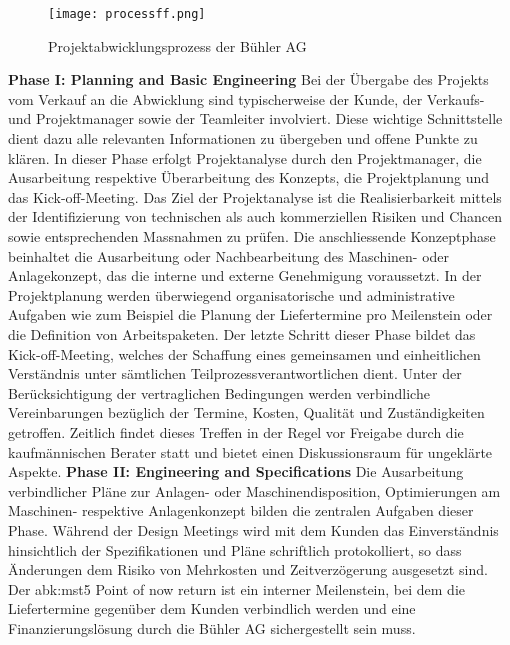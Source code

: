 \begin{figure}[H]
	\centering
	\texttt{[image: processff.png]}
	\caption{Projektabwicklungsprozess der Bühler AG}
	\label{fig: processff}
\end{figure}
\textbf{Phase I: Planning and Basic Engineering}
\newline
Bei der Übergabe des Projekts vom Verkauf an die Abwicklung sind typischerweise der Kunde, der Verkaufs- und Projektmanager sowie der Teamleiter involviert. Diese wichtige Schnittstelle dient dazu alle relevanten Informationen zu übergeben und offene Punkte zu klären. In dieser Phase erfolgt Projektanalyse durch den Projektmanager, die Ausarbeitung respektive Überarbeitung des Konzepts, die Projektplanung und das Kick-off-Meeting. Das Ziel der Projektanalyse ist die Realisierbarkeit mittels der Identifizierung von technischen als auch kommerziellen Risiken und Chancen sowie entsprechenden Massnahmen zu prüfen. Die anschliessende Konzeptphase beinhaltet die Ausarbeitung oder Nachbearbeitung des Maschinen- oder Anlagekonzept, das die interne und  externe Genehmigung voraussetzt. In der Projektplanung werden überwiegend organisatorische und administrative Aufgaben wie zum Beispiel die Planung der Liefertermine pro Meilenstein oder die Definition von Arbeitspaketen. Der letzte Schritt dieser Phase bildet das Kick-off-Meeting, welches der Schaffung eines gemeinsamen und einheitlichen Verständnis unter sämtlichen Teilprozessverantwortlichen dient. Unter der Berücksichtigung der vertraglichen Bedingungen werden verbindliche Vereinbarungen bezüglich der Termine, Kosten, Qualität und Zuständigkeiten getroffen. Zeitlich findet dieses Treffen in der Regel vor Freigabe durch die kaufmännischen Berater statt und bietet einen Diskussionsraum für ungeklärte Aspekte.
\newline\newline
\textbf{Phase II: Engineering and Specifications}
\newline
Die Ausarbeitung verbindlicher Pläne zur Anlagen- oder Maschinendisposition, Optimierungen am Maschinen- respektive Anlagenkonzept bilden die zentralen Aufgaben dieser Phase. Während der Design Meetings wird mit dem Kunden das Einverständnis hinsichtlich der Spezifikationen und Pläne schriftlich protokolliert, so dass Änderungen dem Risiko von Mehrkosten und Zeitverzögerung ausgesetzt sind. Der \gls{abk:mst}5 \glqq Point of now return\grqq{ } ist ein interner Meilenstein, bei dem die Liefertermine gegenüber dem Kunden verbindlich werden und eine Finanzierungslösung durch die Bühler AG sichergestellt sein muss.
